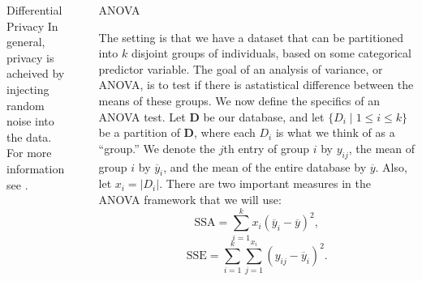 \documentclass[final]{beamer}
\newlength{\sepwid}
\newlength{\onecolwid}
\newlength{\twocolwid}
\begin{document}
\begin{frame}[t]
\begin{columns}[t]
\begin{column}{\onecolwid}
\begin{block}{Differential Privacy}
In general, privacy is acheived by injecting random noise into the data. For more information see \cite{dwork2014algorithmic}.


\end{block}



\end{column} %

\begin{column}{\sepwid}\end{column} %

\begin{column}{\twocolwid} %

\begin{columns}[t,totalwidth=\twocolwid] %

\begin{column}{\onecolwid}\vspace{-.6in} %


\begin{block}{ANOVA}

The setting is that we have a dataset that can be partitioned into $k$ disjoint groups of 
individuals, based on some categorical predictor variable. The goal of an analysis of variance, or ANOVA, is to test if there is astatistical difference between the means of these groups. 
We now define the specifics of an ANOVA test.
Let $\textbf{D}$ be our database, and let $\{D_i \; |\; 1\leq i\leq k \}$ be a partition of 
$\textbf{D}$, where each $D_i$ is what we think of as a ``group.'' We denote the $j$th entry of group $i$ by $y_{ij}$, the mean of group $i$ by $\overline{y}_i$, and the mean of the entire 
database by $\overline{y}$. Also, let $x_i = |D_i|$. 
There are two important measures in the ANOVA framework that we will use:
\[
\text{SSA} = \sum_{i=1}^{k} x_i(\overline{y}_i - \overline{y})^2,
\]
\[
\text{SSE} = \sum_{i=1}^{k} \sum_{j=1}^{x_i} (y_{ij} - \overline{y}_i)^2.
\]


\end{block}
\end{column}
\end{columns}
\end{column}
\end{columns}
\end{frame}
\end{document}
